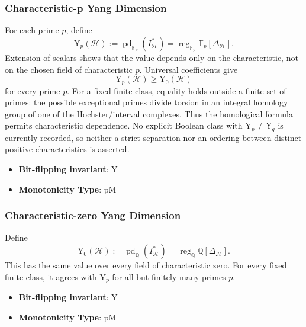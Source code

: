 \subsubsection{Characteristic-p Yang Dimension}
      \begin{definition}\label{def:characteristic_p_yang_dimension}
      For each prime $p$, define
      \[
      \mathrm Y_p(\mathcal H):=\operatorname{pd}_{\mathbb F_p}(I^*_{\mathcal H})
      =\operatorname{reg}_{\mathbb F_p}\mathbb F_p[\Delta_{\mathcal H}].
      \]
      Extension of scalars shows that the value depends only on the characteristic, not on the chosen field of characteristic $p$.  Universal coefficients give
      \[
      \mathrm Y_p(\mathcal H)\geq\mathrm Y_0(\mathcal H)
      \]
      for every prime $p$.  For a fixed finite class, equality holds outside a finite set of primes: the possible exceptional primes divide torsion in an integral homology group of one of the Hochster/interval complexes.  Thus the homological formula permits characteristic dependence.  No explicit Boolean class with $\mathrm Y_p\ne\mathrm Y_q$ is currently recorded, so neither a strict separation nor an ordering between distinct positive characteristics is asserted.
      \end{definition}
      \begin{itemize}
      \item {\bf Bit-flipping invariant}: Y
      \item {\bf Monotonicity Type}: pM
      \end{itemize}
\subsubsection{Characteristic-zero Yang Dimension}
      \begin{definition}\label{def:characteristic_zero_yang_dimension}
      Define
      \[
      \mathrm Y_0(\mathcal H):=\operatorname{pd}_{\mathbb Q}(I^*_{\mathcal H})
      =\operatorname{reg}_{\mathbb Q}\mathbb Q[\Delta_{\mathcal H}].
      \]
      This has the same value over every field of characteristic zero.  For every fixed finite class, it agrees with $\mathrm Y_p$ for all but finitely many primes $p$.
      \end{definition}
      \begin{itemize}
      \item {\bf Bit-flipping invariant}: Y
      \item {\bf Monotonicity Type}: pM
      \end{itemize}
